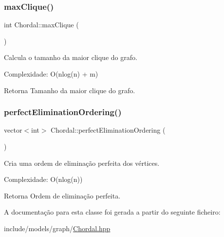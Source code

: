 \subsubsection{\texorpdfstring{max\+Clique()}{maxClique()}}
{\footnotesize\ttfamily int Chordal\+::max\+Clique (\begin{DoxyParamCaption}{ }\end{DoxyParamCaption})}

Calcula o tamanho da maior clique do grafo.

Complexidade\+: O(nlog(n) + m) \begin{DoxyReturn}{Retorna}
Tamanho da maior clique do grafo. 
\end{DoxyReturn}
\mbox{\label{classChordal_a45b66b1ee19a628646d83613d337d94a}} 
\subsubsection{\texorpdfstring{perfect\+Elimination\+Ordering()}{perfectEliminationOrdering()}}
{\footnotesize\ttfamily vector$<$int$>$ Chordal\+::perfect\+Elimination\+Ordering (\begin{DoxyParamCaption}{ }\end{DoxyParamCaption})}

Cria uma ordem de eliminação perfeita dos vértices.

Complexidade\+: O(nlog(n)) \begin{DoxyReturn}{Retorna}
Ordem de eliminação perfeita. 
\end{DoxyReturn}


A documentação para esta classe foi gerada a partir do seguinte ficheiro\+:\begin{DoxyCompactItemize}
\item 
include/models/graph/\hyperlink{Chordal_8hpp}{Chordal.\+hpp}\end{DoxyCompactItemize}
